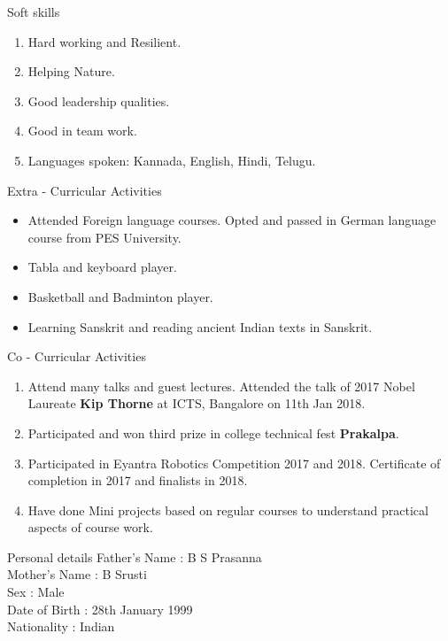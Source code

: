 \documentclass{resume} %
\begin{document}
\vskip 0.5in

\begin{rSection}{Soft skills}
\begin{enumerate}
    \item Hard working and Resilient.
    \item Helping Nature.
    \item Good leadership qualities.
    \item Good in team work.
    \item Languages spoken: Kannada, English, Hindi, Telugu.
\end{enumerate}
\end{rSection}

\vskip 0.5in

\begin{rSection}{Extra - Curricular Activities}
\begin{itemize}
    \item Attended Foreign language courses. Opted and passed in German language course from PES University.
    \item Tabla and keyboard player.
    \item Basketball and Badminton player.
    \item Learning Sanskrit and reading ancient Indian texts in Sanskrit.
\end{itemize}
\end{rSection}

\vskip 0.5in


\begin{rSection}{Co - Curricular Activities}
\begin{enumerate}
    \item Attend many talks and guest lectures. Attended the talk of 2017 Nobel Laureate {\bf Kip Thorne} at ICTS, Bangalore on 11th Jan 2018.
    \item Participated and won third prize in college technical fest {\bf Prakalpa}.
    \item Participated in Eyantra Robotics Competition 2017 and 2018. Certificate of completion in 2017 and finalists in 2018. 
    \item Have done Mini projects based on regular courses to understand practical aspects of course work.
\end{enumerate}
\end{rSection}

\pagebreak

\begin{rSection}{Personal details}
Father's Name : B S Prasanna \\
Mother's Name : B Srusti \\
Sex : Male \\
Date of Birth : 28th January 1999 \\
Nationality : Indian \\
\end{rSection}
\end{document}
